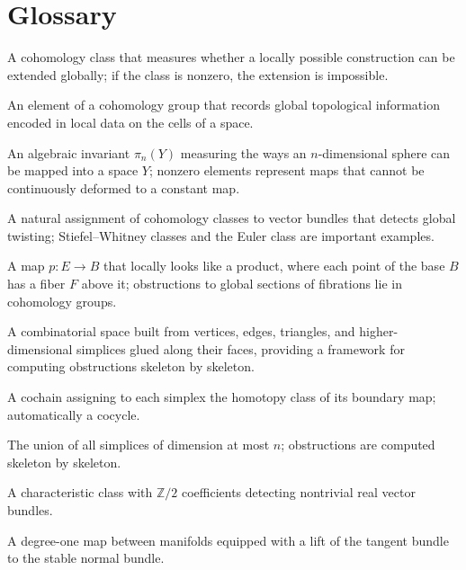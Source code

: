 \section*{Glossary}
\begin{description}[leftmargin=*,style=nextline,itemsep=0.3em]
\item[\textbf{Obstruction.}] A cohomology class that measures whether a locally possible construction can be extended globally; if the class is nonzero, the extension is impossible.
\item[\textbf{Cohomology class.}] An element of a cohomology group that records global topological information encoded in local data on the cells of a space.
\item[\textbf{Homotopy group.}] An algebraic invariant $\pi_n(Y)$ measuring the ways an $n$-dimensional sphere can be mapped into a space $Y$; nonzero elements represent maps that cannot be continuously deformed to a constant map.
\item[\textbf{Characteristic class.}] A natural assignment of cohomology classes to vector bundles that detects global twisting; Stiefel--Whitney classes and the Euler class are important examples.
\item[\textbf{Fibration.}] A map $p:E\to B$ that locally looks like a product, where each point of the base $B$ has a fiber $F$ above it; obstructions to global sections of fibrations lie in cohomology groups.
\item[\textbf{Simplicial complex.}] A combinatorial space built from vertices, edges, triangles, and higher-dimensional simplices glued along their faces, providing a framework for computing obstructions skeleton by skeleton.
\item[\textbf{Obstruction cocycle.}] A cochain assigning to each simplex the homotopy class of its boundary map; automatically a cocycle.
\item[\textbf{$n$-skeleton.}] The union of all simplices of dimension at most $n$; obstructions are computed skeleton by skeleton.
\item[\textbf{Stiefel--Whitney class.}] A characteristic class with $\mathbb{Z}/2$ coefficients detecting nontrivial real vector bundles.
\item[\textbf{Normal map.}] A degree-one map between manifolds equipped with a lift of the tangent bundle to the stable normal bundle.
\end{description}


